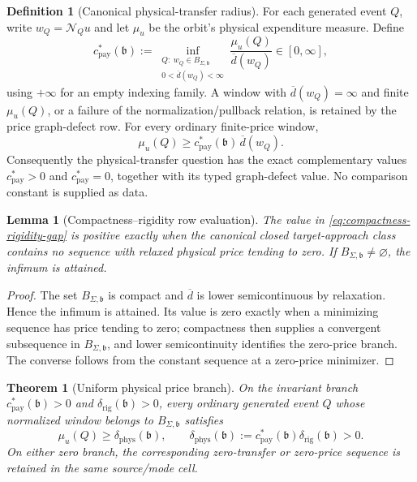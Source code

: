 \documentclass[11pt]{article}
\numberwithin{section}{part}
\theoremstyle{plain}
\newtheorem{theorem}{Theorem}[section]
\newtheorem{lemma}[lemma]{Lemma}
\theoremstyle{definition}
\newtheorem{definition}[definition]{Definition}
\theoremstyle{remark}
\newcommand{\Phys}{\mathrm{phys}}
\begin{document}
\begin{definition}[Canonical physical-transfer radius]
\label{def:physical-price-interface}
For each generated event \(Q\), write \(w_Q=\mathcal N_Qu\) and let \(\mu_u\)
be the orbit's physical expenditure measure.  Define
\begin{equation}
 \label{eq:canonical-physical-transfer-radius}
 c_{\mathrm{pay}}^*(\mathfrak b)
 :=\inf_{\substack{Q:\ w_Q\in B_{\Sigma,\mathfrak b}\\
                         0<\overline d(w_Q)<\infty}}
       \frac{\mu_u(Q)}{\overline d(w_Q)}\in[0,\infty],
\end{equation}
using \(+\infty\) for an empty indexing family.  A window with
\(\overline d(w_Q)=\infty\) and finite \(\mu_u(Q)\), or a failure of the
normalization/pullback relation, is retained by the price graph-defect row.
For every ordinary finite-price window,
\begin{equation}
 \label{eq:physical-price-domination}
 \mu_u(Q)\ge
 c_{\mathrm{pay}}^*(\mathfrak b)\,\overline d(w_Q).
\end{equation}
Consequently the physical-transfer question has the exact complementary
values \(c_{\mathrm{pay}}^*>0\) and \(c_{\mathrm{pay}}^*=0\), together with
its typed graph-defect value.  No comparison constant is supplied as data.
\end{definition}

\begin{lemma}[Compactness--rigidity row evaluation]
\label{lem:compactness-rigidity-price}
The value in \eqref{eq:compactness-rigidity-gap} is positive exactly when the
canonical closed target-approach class contains no sequence with relaxed physical
price tending to zero.  If \(B_{\Sigma,\mathfrak b}\ne\varnothing\), the infimum is
attained.
\end{lemma}

\begin{proof}
The set \(B_{\Sigma,\mathfrak b}\) is compact and \(\overline d\) is lower
semicontinuous by relaxation.  Hence the infimum is attained.  Its value is
zero exactly when a minimizing sequence has price tending to zero; compactness
then supplies a convergent subsequence in \(B_{\Sigma,\mathfrak b}\), and lower semicontinuity
identifies the zero-price branch.  The converse follows from the constant
sequence at a zero-price minimizer.
\end{proof}

\begin{theorem}[Uniform physical price branch]
\label{thm:uniform-physical-price}
On the invariant branch
\(c_{\mathrm{pay}}^*(\mathfrak b)>0\) and
\(\delta_{\mathrm{rig}}(\mathfrak b)>0\), every ordinary generated event \(Q\)
whose normalized window belongs to \(B_{\Sigma,\mathfrak b}\) satisfies
\begin{equation}
 \label{eq:uniform-physical-event-price}
 \mu_u(Q)\ge \delta_{\Phys}(\mathfrak b),
 \qquad
 \delta_{\Phys}(\mathfrak b)
 :=c_{\mathrm{pay}}^*(\mathfrak b)
   \delta_{\mathrm{rig}}(\mathfrak b)>0.
\end{equation}
On either zero branch, the corresponding zero-transfer or zero-price sequence
is retained in the same source/mode cell.
\end{theorem}
\end{document}
